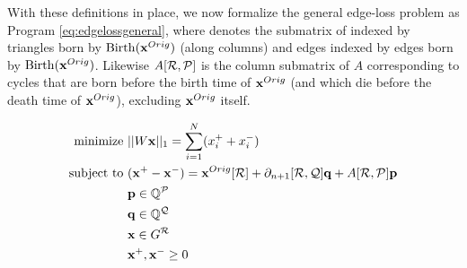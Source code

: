 With these definitions in place, we now formalize the general edge-loss problem as Program \eqref{eq:edgelossgeneral}, where  \DIFdelbegin \DIFdel{$\partial_2[\goodedges,\goodtriangles]$ }\DIFdelend \DIFaddbegin {}\DIFaddend denotes the  submatrix of \DIFdelbegin {}\DIFdelend \DIFaddbegin {}\DIFaddend indexed by triangles born by $\mathrm{Birth}(\mathbf{x}^{Orig})$ (along columns) and edges indexed by edges born by $\mathrm{Birth}(\mathbf{x}^{Orig})$.  Likewise $A[ \mathcal R ,\mathcal P]$ is the column submatrix of $A$ corresponding to cycles that are born  before the birth time of $\mathbf{x}^{Orig}$ (and which die before the death time of $\mathbf{x}^{Orig}$), excluding $\mathbf{x}^{Orig}$ itself.

 
\begin{align}
\DIFdelbegin %
\DIFdelend \DIFaddbegin \begin{split}
    \text{minimize   } & ||W \optimalrep ||_1 = \sum_{i=1}^N  (x^+_i + x_i^-)\\
   \text{subject to  } &  
      (\optimalrep^+ - \optimalrep^- )= \originalrep[\goodedges] +   \partial_{n+1}[\goodedges, \goodtriangles]  \q + A[\goodedges, \goodcycleindices] \p \\
      & \p \in \Q^{\goodcycleindices} \\
      & \q \in \Q^{\goodtriangles} \\      
      & \optimalrep \in G^{\goodedges } \\      
      & \optimalrep^+, \optimalrep^- \geq 0 
      \end{split}\DIFaddend 
      \label{eq:edgelossgeneral}
\end{align}




